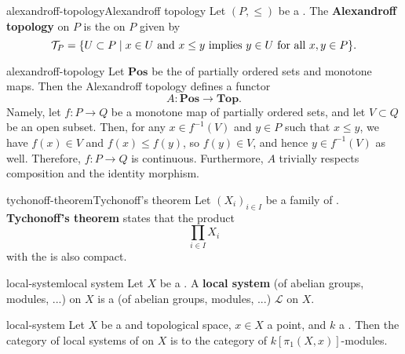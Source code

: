 \begin{topic}{alexandroff-topology}{Alexandroff topology}
    Let $(P, \le)$ be a . The \textbf{Alexandroff topology} on $P$ is the  on $P$ given by
    \[ \mathcal{T}_P = \{ U \subset P \mid x \in U \textup{ and } x \le y \textup{ implies } y \in U \textup{ for all } x, y \in P \} . \]
\end{topic}

\begin{example}{alexandroff-topology}
    Let $\textbf{Pos}$ be the  of partially ordered sets and monotone maps. Then the Alexandroff topology defines a functor
    \[ A : \textbf{Pos} \to \textbf{Top} . \]
    Namely, let $f : P \to Q$ be a monotone map of partially ordered sets, and let $V \subset Q$ be an open subset. Then, for any $x \in f^{-1}(V)$ and $y \in P$ such that $x \le y$, we have $f(x) \in V$ and $f(x) \le f(y)$, so $f(y) \in V$, and hence $y \in f^{-1}(V)$ as well. Therefore, $f : P \to Q$ is continuous. Furthermore, $A$ trivially respects composition and the identity morphism.
\end{example}

\begin{topic}{tychonoff-theorem}{Tychonoff's theorem}
    Let $(X_i)_{i \in I}$ be a family of  . \textbf{Tychonoff's theorem} states that the product
    \[ \prod_{i \in I} X_i \]
    with the  is also compact.
\end{topic}

\begin{topic}{local-system}{local system}
    Let $X$ be a . A \textbf{local system} (of abelian groups, modules, ...) on $X$ is a  (of abelian groups, modules, ...) $\mathcal{L}$ on $X$.
\end{topic}

\begin{example}{local-system}
    Let $X$ be a  and  topological space, $x \in X$ a point, and $k$ a . Then the category of local systems of  on $X$ is  to the category of $k[\pi_1(X, x)]$-modules.
\end{example}

